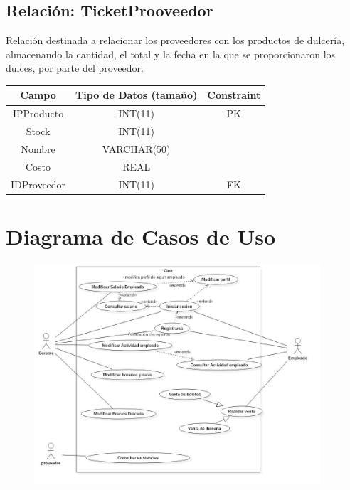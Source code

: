 \documentclass[12pt, fleqn]{report}                             %
\begin{document}
        \subsection*{Relación: TicketProoveedor}

            Relación destinada a relacionar los proveedores con los productos de dulcería, almacenando la cantidad, el total y la fecha en la que se proporcionaron los dulces, por parte del proveedor.

            \vspace{2em}

            \small{
            \begin{tabular}{| c | c | c |}
                \hline
                \textbf{Campo} & \textbf{Tipo de Datos (tamaño)} & \textbf{Constraint} \\[0.5ex] 
                \hline\hline
                
                IPProducto      & INT(11)       & PK                    \\
                Stock           & INT(11)       &                       \\
                Nombre          & VARCHAR(50)   &                       \\
                Costo           & REAL          &                       \\
                IDProveedor     & INT(11)       & FK                    \\
                \hline
            \end{tabular}
            }


    \clearpage
    \section{Diagrama de Casos de Uso}

        \begin{figure}[h]
            \centering
            \includegraphics[width=0.95\textwidth]{DiagramasDeCasosDeUso}
        \end{figure}
\end{document}
